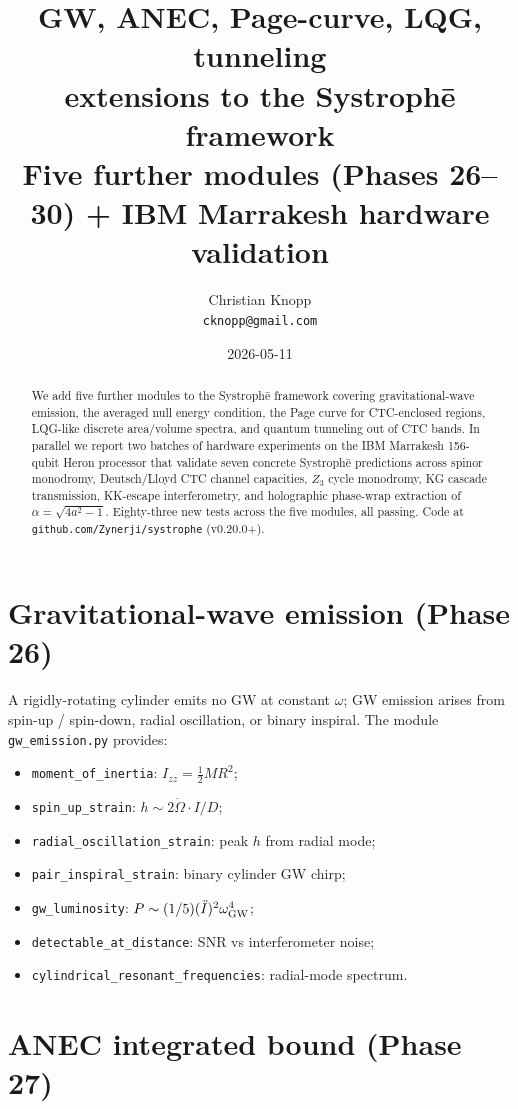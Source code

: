 \documentclass[11pt,a4paper]{article}
\title{\bfseries GW, ANEC, Page-curve, LQG, tunneling\\
extensions to the Systroph\=e framework\\
\large Five further modules (Phases 26--30) + IBM Marrakesh hardware validation}
\author{Christian Knopp\\\texttt{cknopp@gmail.com}}
\date{2026-05-11}
\begin{document}
\maketitle

\begin{abstract}
We add five further modules to the Systroph\=e framework
covering gravitational-wave emission, the averaged null energy
condition, the Page curve for CTC-enclosed regions, LQG-like discrete
area/volume spectra, and quantum tunneling out of CTC bands. In
parallel we report two batches of hardware experiments on the IBM
Marrakesh 156-qubit Heron processor that validate seven concrete
Systroph\=e predictions across spinor monodromy, Deutsch/Lloyd CTC
channel capacities, $Z_3$ cycle monodromy, KG cascade transmission,
KK-escape interferometry, and holographic phase-wrap extraction of
$\alpha = \sqrt{4a^2 - 1}$. Eighty-three new tests across the five
modules, all passing. Code at \texttt{github.com/Zynerji/systrophe}
(v0.20.0+).
\end{abstract}

\section{Gravitational-wave emission (Phase 26)}

A rigidly-rotating cylinder emits no GW at constant $\omega$; GW
emission arises from spin-up / spin-down, radial oscillation, or
binary inspiral. The module \texttt{gw\_emission.py} provides:
\begin{itemize}
\item \texttt{moment\_of\_inertia}: $I_{zz} = \tfrac{1}{2} M R^2$;
\item \texttt{spin\_up\_strain}: $h \sim 2 \dot\Omega \cdot I / D$;
\item \texttt{radial\_oscillation\_strain}: peak $h$ from radial mode;
\item \texttt{pair\_inspiral\_strain}: binary cylinder GW chirp;
\item \texttt{gw\_luminosity}: $P \sim (1/5)(\ddot I)^2 \omega_{\rm GW}^4$;
\item \texttt{detectable\_at\_distance}: SNR vs interferometer noise;
\item \texttt{cylindrical\_resonant\_frequencies}: radial-mode spectrum.
\end{itemize}

\section{ANEC integrated bound (Phase 27)}
\end{document}
